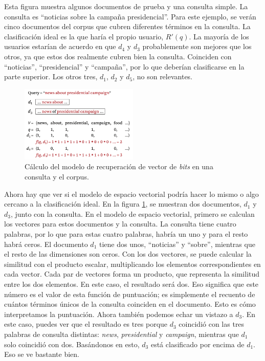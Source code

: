 Esta figura muestra algunos documentos de prueba y una consulta simple. La consulta es ``noticias sobre la campaña presidencial''. Para este ejemplo, se verán cinco documentos del corpus que cubren diferentes términos en la consulta. La clasificación ideal es la que haría el propio usuario, $R'(q)$. La mayoría de los usuarios estarían de acuerdo en que $d_4$ y $d_3$ probablemente son mejores que los otros, ya que estos dos realmente cubren bien la consulta. Coinciden con ``noticias'', ``presidencial'' y ``campaña'', por lo que deberían clasificarse en la parte superior. Los otros tres, $d_1$, $d_2$ y $d_5$, no son relevantes. \\

\begin{figure}[h]
\centering
\includegraphics[width=0.5\textwidth]{fotos/20.png}
\caption{Cálculo del modelo de recuperación de vector de \textit{bits} en una consulta y el corpus.}
\label{fig:6.5}
\end{figure}

Ahora hay que ver si el modelo de espacio vectorial podría hacer lo mismo o algo cercano a la clasificación ideal. En la figura \ref{fig:6.5}, se muestran dos documentos, $d_1$ y $d_3$, junto con la consulta. En el modelo de espacio vectorial, primero se calculan los vectores para estos documentos y la consulta. La consulta tiene cuatro palabras, por lo que para estas cuatro palabras, habría un uno y para el resto habrá ceros. El documento $d_1$ tiene dos unos, ``noticias'' y ``sobre'', mientras que el resto de las dimensiones son ceros. Con los dos vectores, se puede calcular la similitud con el producto escalar, multiplicando los elementos correspondientes en cada vector. Cada par de vectores forma un producto, que representa la similitud entre los dos elementos. En este caso, el resultado será dos. Eso significa que este número es el valor de esta función de puntuación; es simplemente el recuento de cuántos términos únicos de la consulta coinciden en el documento. Esto es cómo interpretamos la puntuación. Ahora también podemos echar un vistazo a $d_3$. En este caso, puedes ver que el resultado es tres porque $d_3$ coincidió con las tres palabras de consulta distintas: \textit{news}, \textit{presidential} y \textit{campaign}, mientras que $d_1$ solo coincidió con dos. Basándonos en esto, $d_3$ está clasificado por encima de $d_1$. Eso se ve bastante bien.\\

